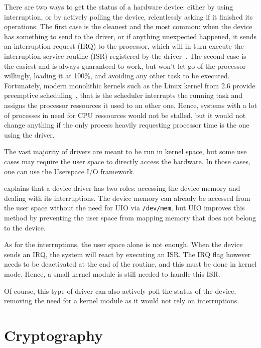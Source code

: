 There are two ways to get the status of a hardware device: either by using interruption, or by actively polling the device, relentlessly asking if it finished its operations.
The first case is the cleanest and the most common: when the device has something to send to the driver, or if anything unexpected happened, it sends an interruption request (IRQ) to the processor, which will in turn execute the interruption service routine (ISR) registered by the driver~\citep[chap. 10]{Corbet:2005:LDD:1209083}.
The second case is the easiest and is always guaranteed to work, but won't let go of the processor willingly, loading it at 100\%, and avoiding any other task to be executed.
Fortunately, modern monolithic kernels such as the Linux kernel from 2.6 provide preemptive scheduling~\cite{Santhanam2003}, that is the scheduler interrupts the running task and assigns the processor ressources it used to an other one.
Hence, systems with a lot of processes in need for CPU ressources would not be stalled, but it would not change anything if the only process heavily requesting processor time is the one using the driver.\newline{}

The vast majority of drivers are meant to be run in kernel space, but some use cases may require the user space to directly access the hardware.
In those cases, one can use the Userspace I/O framework.

\citet{koch2011} explains that a device driver has two roles: accessing the device memory and dealing with its interruptions.
The device memory can already be accessed from the user space without the need for UIO via \texttt{/dev/mem}, but UIO improves this method by preventing the user space from mapping memory that does not belong to the device.

\noindent As for the interruptions, the user space alone is not enough.
When the device sends an IRQ, the system will react by executing an ISR.
The IRQ flag however needs to be deactivated at the end of the routine, and this must be done in kernel mode.
Hence, a small kernel module is still needed to handle this ISR.

\noindent Of course, this type of driver can also actively poll the status of the device, removing the need for a kernel module as it would not rely on interruptions.




\section{Cryptography}

